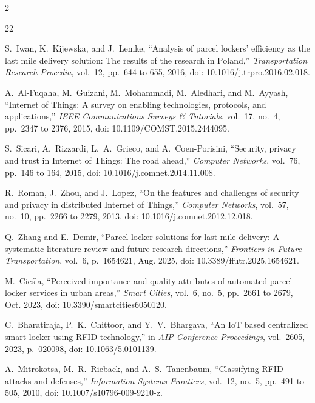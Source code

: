\documentclass[journal,onecolumn]{IEEEtran}
\begin{document}
\begingroup
\def\IEEEbibitemsep{0pt}
\def\footnotesize{\fontsize{6.4pt}{7.3pt}\selectfont}
\setlength{\multicolsep}{2pt plus 1pt minus 1pt}
\begin{multicols}{2}
\begin{thebibliography}{22}

S.~Iwan, K.~Kijewska, and J.~Lemke, ``Analysis of parcel lockers' efficiency as the last mile delivery solution: The results of the research in Poland,'' \emph{Transportation Research Procedia}, vol.~12, pp.~644 to 655, 2016, doi: 10.1016/j.trpro.2016.02.018.

A.~Al-Fuqaha, M.~Guizani, M.~Mohammadi, M.~Aledhari, and M.~Ayyash, ``Internet of Things: A survey on enabling technologies, protocols, and applications,'' \emph{IEEE Communications Surveys \& Tutorials}, vol.~17, no.~4, pp.~2347 to 2376, 2015, doi: 10.1109/COMST.2015.2444095.

S.~Sicari, A.~Rizzardi, L.~A.~Grieco, and A.~Coen-Porisini, ``Security, privacy and trust in Internet of Things: The road ahead,'' \emph{Computer Networks}, vol.~76, pp.~146 to 164, 2015, doi: 10.1016/j.comnet.2014.11.008.

R.~Roman, J.~Zhou, and J.~Lopez, ``On the features and challenges of security and privacy in distributed Internet of Things,'' \emph{Computer Networks}, vol.~57, no.~10, pp.~2266 to 2279, 2013, doi: 10.1016/j.comnet.2012.12.018.

Q.~Zhang and E.~Demir, ``Parcel locker solutions for last mile delivery: A systematic literature review and future research directions,'' \emph{Frontiers in Future Transportation}, vol.~6, p.~1654621, Aug. 2025, doi: 10.3389/ffutr.2025.1654621.

M.~Cie{\'s}la, ``Perceived importance and quality attributes of automated parcel locker services in urban areas,'' \emph{Smart Cities}, vol.~6, no.~5, pp.~2661 to 2679, Oct. 2023, doi: 10.3390/smartcities6050120.

C.~Bharatiraja, P.~K.~Chittoor, and Y.~V.~Bhargava, ``An IoT based centralized smart locker using RFID technology,'' in \emph{AIP Conference Proceedings}, vol.~2605, 2023, p.~020098, doi: 10.1063/5.0101139.

A.~Mitrokotsa, M.~R.~Rieback, and A.~S.~Tanenbaum, ``Classifying RFID attacks and defenses,'' \emph{Information Systems Frontiers}, vol.~12, no.~5, pp.~491 to 505, 2010, doi: 10.1007/s10796-009-9210-z.


\end{thebibliography}
\end{multicols}
\end{document}

